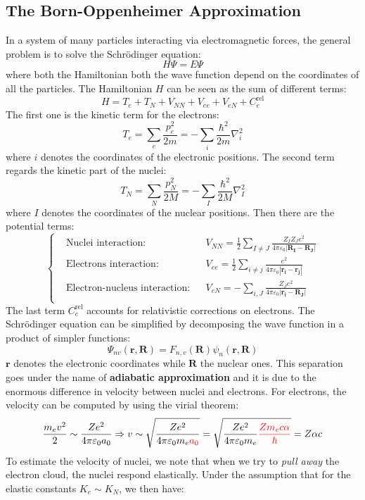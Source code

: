 \documentclass[10.75pt,a4paper,openright,bottom=2cm]{article}
\renewcommand{\Vec}[1]{\boldsymbol{#1}}
\begin{document}
\subsection{The Born-Oppenheimer Approximation}
In a system of many particles interacting via electromagnetic forces, the general problem is to solve the Schr\"odinger equation:
\[
H\Psi=E\Psi
\]
where both the Hamiltonian both the wave function depend on the coordinates of all the particles. The Hamiltonian $H$ can be seen as the sum of different terms:
\[
H=T_e+T_N+V_{NN}+V_{ee}+V_{eN}+C_e^{\text{rel}}
\]
The first one is the kinetic term for the electrons:
\[
T_e=\sum_e\frac{p_e^2}{2m}=-\sum_i\frac{\hbar^2}{2m}\nabla_i^2
\]
where $i$ denotes the coordinates of the electronic positions. The second term regards the kinetic part of the nuclei:
\[
T_N=\sum_N\frac{p_N^2}{2M}=-\sum_I\frac{\hbar^2}{2M}\nabla^2_I
\]
where $I$ denotes the coordinates of the nuclear positions. Then there are the potential terms:
\[
\left\{
\begin{aligned}
&\text{Nuclei interaction:} &&V_{NN}=\frac{1}{2}\sum_{I\neq J}\frac{Z_IZ_Je^2}{4\pi\varepsilon_0|\Vec{R_I}-\Vec{R_J}|}\\
&\text{Electrons interaction:} &&V_{ee}=\frac{1}{2}\sum_{i\neq j}\frac{e^2}{4\pi\varepsilon_0|\Vec{r_i}-\Vec{r_j}|}\\
&\text{Electron-nucleus interaction:} &&V_{eN}=-\sum_{i,J}\frac{Z_Je^2}{4\pi\varepsilon_0|\Vec{r_i}-\Vec{R_J}|}\\
\end{aligned}
\right.
\]
The last term $C_e^{\text{rel}}$ accounts for relativistic corrections on electrons. The Schr\"odinger equation can be simplified by decomposing the wave function in a product of simpler functions:
\[
\Psi_{nv}(\Vec{r},\Vec{R})=F_{n,v}(\Vec{R})\psi_n(\Vec{r},\Vec{R})
\]
$\Vec{r}$ denotes the electronic coordinates while $\Vec{R}$ the nuclear ones. This separation goes under the name of \textbf{adiabatic approximation} and it is due to the enormous difference in velocity between nuclei and electrons. For electrons, the velocity can be computed by using the virial theorem:
\[
\frac{m_ev^2}{2}\sim\frac{Ze^2}{4\pi\varepsilon_0a_0}\Rightarrow v\sim\sqrt{\frac{Ze^2}{4\pi\varepsilon_0m_e{\color{red}{a_0}}}}=\sqrt{\frac{Ze^2}{4\pi\varepsilon_0m_e}{\color{red}{\frac{Zm_ec\alpha}{\hbar}}}}=Z\alpha c
\]
To estimate the velocity of nuclei, we note that when we try to \textit{pull away} the electron cloud, the nuclei respond elastically. Under the assumption that for the elastic constants $K_e\sim K_N$, we then have:
\end{document}
